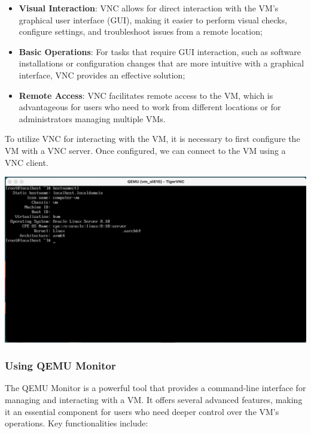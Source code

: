 \begin{itemize}
    \item \textbf{Visual Interaction}: VNC allows for direct interaction with the VM's graphical user interface (GUI), making it easier to perform visual checks, configure settings, and troubleshoot issues from a remote location;
    \item \textbf{Basic Operations}: For tasks that require GUI interaction, such as software installations or configuration changes that are more intuitive with a graphical interface, VNC provides an effective solution;
    \item \textbf{Remote Access}: VNC facilitates remote access to the VM, which is advantageous for users who need to work from different locations or for administrators managing multiple VMs.
\end{itemize}

To utilize VNC for interacting with the VM, it is necessary to first configure the VM with a VNC server. Once configured, we can connect to the VM using a VNC client.

\begin{center}
    \centering
    \includegraphics[width=\textwidth]{Images/VNC Client.png}
    \label{fig}
\end{center}

\subsubsection[Using QEMU Monitor]{Using QEMU Monitor}

The QEMU Monitor is a powerful tool that provides a command-line interface for managing and interacting with a VM. It offers several advanced features, making it an essential component for users who need deeper control over the VM's operations. Key functionalities include:

